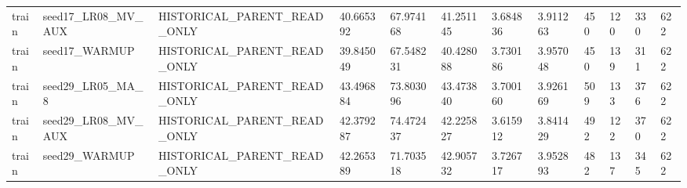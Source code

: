 \begin{tabular}{llllllllllll}
train & seed17\_LR08\_MV\_AUX & HISTORICAL\_PARENT\_READ\_ONLY & 40.665392 & 67.974168 & 41.251145 & 3.684836 & 3.911263 & 450 & 120 & 330 & 622 \\
train & seed17\_WARMUP & HISTORICAL\_PARENT\_READ\_ONLY & 39.845049 & 67.548231 & 40.428088 & 3.730186 & 3.957048 & 450 & 139 & 311 & 622 \\
train & seed29\_LR05\_MA\_8 & HISTORICAL\_PARENT\_READ\_ONLY & 43.496884 & 73.803096 & 43.473840 & 3.700160 & 3.926169 & 509 & 133 & 376 & 622 \\
train & seed29\_LR08\_MV\_AUX & HISTORICAL\_PARENT\_READ\_ONLY & 42.379287 & 74.472437 & 42.225827 & 3.615912 & 3.841429 & 492 & 122 & 370 & 622 \\
train & seed29\_WARMUP & HISTORICAL\_PARENT\_READ\_ONLY & 42.265389 & 71.703518 & 42.905732 & 3.726717 & 3.952893 & 482 & 137 & 345 & 622 \\
\bottomrule
\end{tabular}
